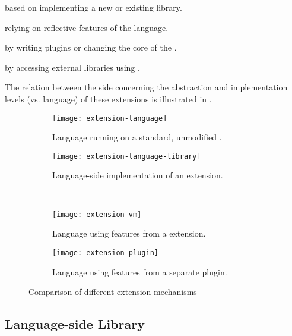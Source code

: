 \begin{description}[noitemsep]
	\item[Language-side Library] based on implementing a new or existing library. 
	\item[Reflective Extension] relying on reflective features of the language. 
	\item[\VM Extension] by writing plugins or changing the core of the \VM.
	\item[Hybrid Extension] by accessing external libraries using \FFI.  
\end{description}
%
The relation between the side concerning the abstraction and implementation levels (\VM vs. language) of these extensions is illustrated in .

\begin{figure}[h]
	\centering
	\begin{subfigure}[t]{0.45\textwidth}
		\centering
		\texttt{[image: extension-language]}
		\caption{Language running on a standard, unmodified \VM.}
	\end{subfigure}\hspace{0.09\textwidth}
	\begin{subfigure}[t]{0.45\textwidth}
		\centering
		\texttt{[image: extension-language-library]}
		\caption{Language-side implementation of an extension.}
	\end{subfigure} \\
	\vspace{\baselineskip}
	\begin{subfigure}[b]{0.45\textwidth}
		\centering
		\texttt{[image: extension-vm]}
		\caption{Language using features from a \VM extension.}
	\end{subfigure}\hspace{0.09\textwidth}
	\begin{subfigure}[b]{0.45\textwidth}
		\centering
		\texttt{[image: extension-plugin]}
		\caption{Language using features from a separate \VM plugin.}
	\end{subfigure}
	
	\caption[Language Extension Mechanisms]{Comparison of different extension mechanisms}
\end{figure}

\subsection{Language-side Library}

